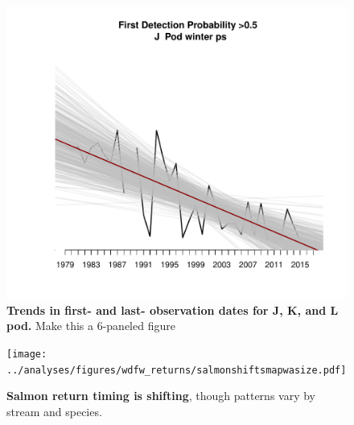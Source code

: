 \documentclass{article}
\begin{document}
\begin{figure}[p]
\includegraphics{../analyses/figures/J/orcaphen_1976_2017_PS_winter_Jfirst.pdf} 
\caption{\textbf{Trends in first- and last- observation dates for J, K, and L pod.} Make this a 6-paneled figure}
 \label{fig:occupancy}
 \end{figure}

\begin{figure}[p]
\texttt{[image: ../analyses/figures/wdfw\_returns/salmonshiftsmapwasize.pdf]} 
\caption{\textbf{Salmon return timing is shifting}, though patterns vary by stream and species.}
 \label{fig:salmon}
 \end{figure}


\end{document}
